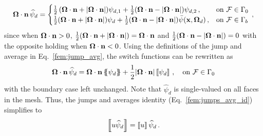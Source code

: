 \documentclass[../doc.tex]{subfiles}
\begin{document}
	\begin{equation}
		\Omegahat\cdot\n\,\widehat{\psi}_d = \begin{cases}
			\frac{1}{2}\paren{\Omegahat\cdot\n + |\Omegahat\cdot\n|}\!\psi_{d,1} + \frac{1}{2}(\Omegahat\cdot\n - |\Omegahat\cdot\n|)\psi_{d,2} \,, & \text{on}\ \mathcal{F} \in \Gamma_0 \\ 
			\frac{1}{2}(\Omegahat\cdot\n + |\Omegahat\cdot\n|)\psi_{d} + \frac{1}{2}(\Omegahat\cdot\n - |\Omegahat\cdot\n|)\bar{\psi}(\x,\Omegahat_d) \,, & \text{on}\ \mathcal{F} \in \Gamma_b 
		\end{cases} \,, 
	\end{equation}
since when $\boldsymbol{\Omega}\cdot\boldsymbol{\mathrm{n}}>0$, $\frac{1}{2}(\boldsymbol{\Omega}\cdot\boldsymbol{\mathrm{n}} + |\boldsymbol{\Omega}\cdot\boldsymbol{\mathrm{n}}|) = \boldsymbol{\Omega}\cdot\boldsymbol{\mathrm{n}}$ and $\frac{1}{2}(\boldsymbol{\Omega}\cdot\boldsymbol{\mathrm{n}} - |\boldsymbol{\Omega}\cdot\boldsymbol{\mathrm{n}}|) = 0$ with the opposite holding when $\boldsymbol{\Omega}\cdot\boldsymbol{\mathrm{n}}<0$. Using the definitions of the jump and average in Eq.~\ref{fem:jump_avg}, the switch functions can be rewritten as 
	\begin{equation}
		\Omegahat\cdot\n\,\widehat{\psi}_d = 
			\Omegahat\cdot\n\avg{\psi_d} + \frac{1}{2}|\Omegahat\cdot\n|\jump{\psi_d} \,, \quad \text{on}\ \mathcal{F} \in \Gamma_0 
	\end{equation}
with the boundary case left unchanged. Note that $\widehat{\psi}_d$ is single-valued on all faces in the mesh. Thus, the jumps and averages identity (Eq.~\ref{fem:jumps_avg_id}) simplifies to 
	\begin{equation}
		\left\llbracket u\widehat{\psi}_d \right\rrbracket = \left\llbracket u \right\rrbracket \widehat{\psi}_d \,. 
	\end{equation}
\end{document}
